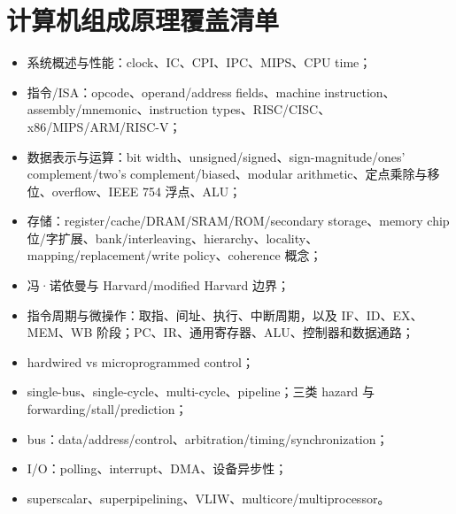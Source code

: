 \documentclass[11pt,a4paper,openany]{ctexbook}
\begin{document}
\section{计算机组成原理覆盖清单}
\begin{itemize}
  \item 系统概述与性能：clock、IC、CPI、IPC、MIPS、CPU time；
  \item 指令/ISA：opcode、operand/address fields、machine instruction、assembly/mnemonic、instruction types、RISC/CISC、x86/MIPS/ARM/RISC-V；
  \item 数据表示与运算：bit width、unsigned/signed、sign-magnitude/ones' complement/two's complement/biased、modular arithmetic、定点乘除与移位、overflow、IEEE 754 浮点、ALU；
  \item 存储：register/cache/DRAM/SRAM/ROM/secondary storage、memory chip 位/字扩展、bank/interleaving、hierarchy、locality、mapping/replacement/write policy、coherence 概念；
  \item 冯·诺依曼与 Harvard/modified Harvard 边界；
  \item 指令周期与微操作：取指、间址、执行、中断周期，以及 IF、ID、EX、MEM、WB 阶段；PC、IR、通用寄存器、ALU、控制器和数据通路；
  \item hardwired vs microprogrammed control；
  \item single-bus、single-cycle、multi-cycle、pipeline；三类 hazard 与 forwarding/stall/prediction；
  \item bus：data/address/control、arbitration/timing/synchronization；
  \item I/O：polling、interrupt、DMA、设备异步性；
  \item superscalar、superpipelining、VLIW、multicore/multiprocessor。
\end{itemize}
\end{document}
